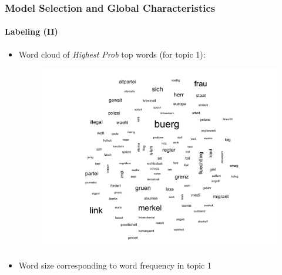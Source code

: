\documentclass[xcolor=dvipsnames]{beamer}
\begin{document}
\begin{frame}
\frametitle{Model Selection and Global Characteristics}
\framesubtitle{Labeling (II)}
\begin{itemize}
\item Word cloud of \textit{Highest Prob} top words (for topic 1):
	\begin{figure}[h!]
  	\centering
  	\includegraphics[scale = 0.35]{../plots/4_2/t1_wordcloud.pdf}
	\end{figure}
\item Word size corresponding to word frequency in topic 1
\end{itemize}
\end{frame}
\end{document}
